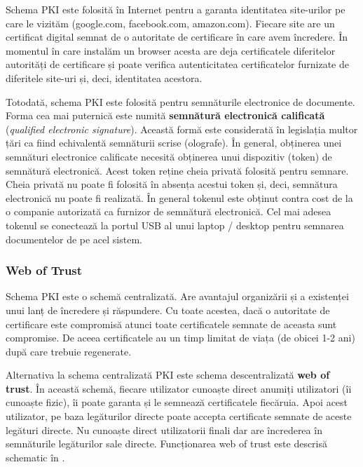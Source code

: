 Schema PKI este folosită în Internet pentru a garanta identitatea site-urilor pe care le vizităm (google.com, facebook.com, amazon.com).
Fiecare site are un certificat digital semnat de o autoritate de certificare în care avem încredere.
În momentul în care instalăm un browser acesta are deja certificatele diferitelor autorități de certificare și poate verifica autenticitatea certificatelor furnizate de diferitele site-uri și, deci, identitatea acestora.

Totodată, schema PKI este folosită pentru semnăturile electronice de documente.
Forma cea mai puternică este numită \textbf{semnătură electronică calificată} (\textit{qualified electronic signature}).
Această formă este considerată în legislația multor țări ca fiind echivalentă semnăturii scrise (olografe).
În general, obținerea unei semnături electronice calificate necesită obținerea unui dispozitiv (token) de semnătură electronică.
Acest token reține cheia privată folosită pentru semnare.
Cheia privată nu poate fi folosită în absența acestui token și, deci, semnătura electronică nu poate fi realizată.
În general tokenul este obținut contra cost de la o companie autorizată ca furnizor de semnătură electronică.
Cel mai adesea tokenul se conectează la portul USB al unui laptop / desktop pentru semnarea documentelor de pe acel sistem.

\subsubsection{Web of Trust}
\label{sec:sec:transfer:sign:wot}

Schema PKI este o schemă centralizată.
Are avantajul organizării și a existenței unui lanț de încredere și răspundere.
Cu toate acestea, dacă o autoritate de certificare este compromisă atunci toate certificatele semnate de aceasta sunt compromise.
De aceea certificatele au un timp limitat de viața (de obicei 1-2 ani) după care trebuie regenerate.

Alternativa la schema centralizată PKI este schema descentralizată \textbf{web of trust}.
În această schemă, fiecare utilizator cunoaște direct anumiți utilizatori (îi cunoaște fizic), îi poate garanta și le semnează certificatele fiecăruia.
Apoi acest utilizator, pe baza legăturilor directe poate accepta certificate semnate de aceste legături directe.
Nu cunoaște direct utilizatorii finali dar are încrederea în semnăturile legăturilor sale directe.
Funcționarea web of trust este descrisă schematic în .


